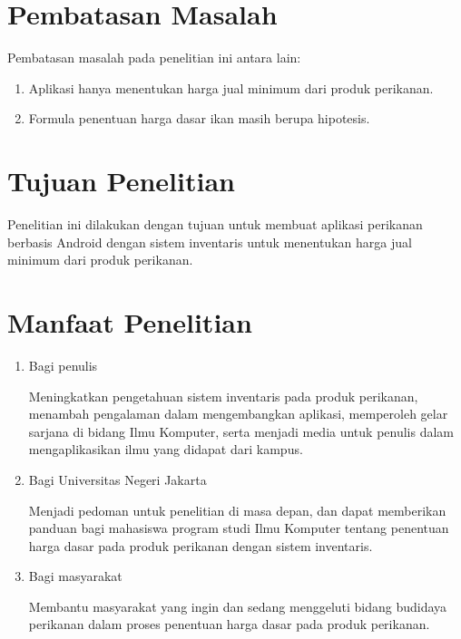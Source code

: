 \begin{spacing}{1.5}
\section{Pembatasan Masalah}
Pembatasan masalah pada penelitian ini antara lain:
\begin{enumerate}
	\item Aplikasi hanya menentukan harga jual minimum dari produk perikanan.
	\item Formula penentuan harga dasar ikan masih berupa hipotesis.
\end{enumerate}

\section{Tujuan Penelitian}
	Penelitian ini dilakukan dengan tujuan untuk membuat aplikasi perikanan berbasis Android dengan sistem inventaris untuk menentukan harga jual minimum dari produk perikanan.

\section{Manfaat Penelitian}
\begin{enumerate}
	\item Bagi penulis
		
	Meningkatkan pengetahuan sistem inventaris pada produk perikanan, menambah pengalaman dalam mengembangkan aplikasi, memperoleh gelar sarjana di bidang Ilmu Komputer, serta menjadi media untuk penulis dalam mengaplikasikan ilmu yang didapat dari kampus.
		
	\item Bagi Universitas Negeri Jakarta
	 	
	Menjadi pedoman untuk penelitian di masa depan, dan dapat memberikan panduan bagi mahasiswa program studi Ilmu Komputer tentang penentuan harga dasar pada produk perikanan dengan sistem inventaris.
	
	\item Bagi masyarakat
	 	
	Membantu masyarakat yang ingin dan sedang menggeluti bidang budidaya perikanan dalam proses penentuan harga dasar pada produk perikanan.
	 			
\end{enumerate}


\begin{comment}

\end{comment}

\end{spacing}